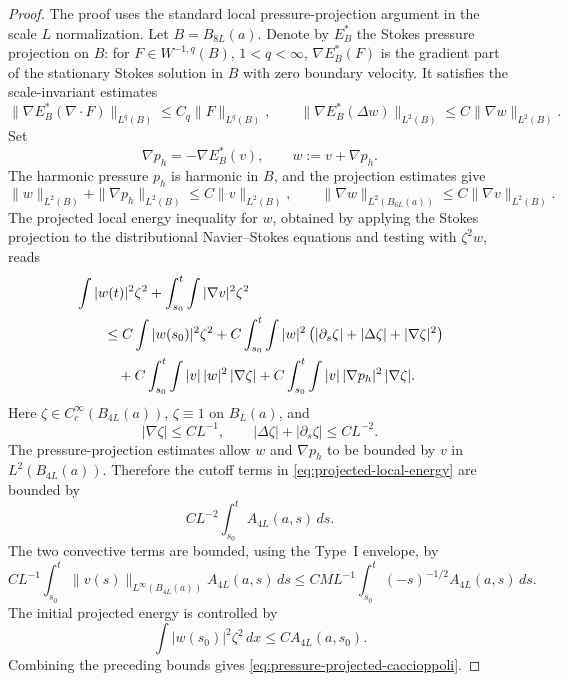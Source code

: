 \documentclass[11pt]{amsart}
\numberwithin{equation}{section}
\theoremstyle{plain}
\theoremstyle{definition}
\theoremstyle{remark}
\begin{document}
\begin{proof}
The proof uses the standard local pressure-projection argument in the scale \(L\)
normalization.  Let \(B=B_{8L}(a)\).  Denote by \(E_B^*\) the Stokes pressure
projection on \(B\): for \(F\in W^{-1,q}(B)\), \(1<q<\infty\),
\(\nabla E_B^*(F)\) is the gradient part of the stationary Stokes solution in
\(B\) with zero boundary velocity.  It satisfies the scale-invariant estimates
\[
   \|\nabla E_B^*(\nabla\cdot F)\|_{L^q(B)}
   \le C_q\|F\|_{L^q(B)},\qquad
   \|\nabla E_B^*(\Delta w)\|_{L^2(B)}
   \le C\|\nabla w\|_{L^2(B)}.
\]
Set
\[
   \nabla p_h=-\nabla E_B^*(v),\qquad
   w:=v+\nabla p_h .
\]
The harmonic pressure \(p_h\) is harmonic in \(B\), and the projection estimates
give
\[
   \|w\|_{L^2(B)}+\|\nabla p_h\|_{L^2(B)}
   \le C\|v\|_{L^2(B)},\qquad
   \|\nabla w\|_{L^2(B_{6L}(a))}
   \le C\|\nabla v\|_{L^2(B)} .
\]
The projected local energy inequality for \(w\), obtained by applying the
Stokes projection to the distributional Navier--Stokes equations and testing
with \(\zeta^2 w\), reads
\begin{align}
   &\int |w(t)|^2\zeta^2
      +\int_{s_0}^{t}\int |\nabla v|^2\zeta^2              \notag\\
   &\qquad\le
      C\int |w(s_0)|^2\zeta^2
      +C\int_{s_0}^{t}\int |w|^2
        \left(|\partial_s\zeta|+|\Delta\zeta|+|\nabla\zeta|^2\right)
                                                                  \notag\\
   &\qquad\quad
      +C\int_{s_0}^{t}\int |v|\,|w|^2\,|\nabla\zeta|
      +C\int_{s_0}^{t}\int |v|\,|\nabla p_h|^2\,|\nabla\zeta| .
\label{eq:projected-local-energy}
\end{align}
Here \(\zeta\in C_c^\infty(B_{4L}(a))\), \(\zeta\equiv1\) on \(B_L(a)\), and
\[
   |\nabla\zeta|\le CL^{-1},\qquad
   |\Delta\zeta|+|\partial_s\zeta|\le CL^{-2}.
\]
The pressure-projection estimates allow \(w\) and \(\nabla p_h\) to be bounded
by \(v\) in \(L^2(B_{4L}(a))\).  Therefore the cutoff terms in
\eqref{eq:projected-local-energy} are bounded by
\[
   C L^{-2}\int_{s_0}^{t}A_{4L}(a,s)\,ds .
\]
The two convective terms are bounded, using the Type~I envelope, by
\[
   C L^{-1}\int_{s_0}^{t}
      \|v(s)\|_{L^\infty(B_{4L}(a))}A_{4L}(a,s)\,ds
   \le
   CML^{-1}\int_{s_0}^{t}(-s)^{-1/2}A_{4L}(a,s)\,ds .
\]
The initial projected energy is controlled by
\[
   \int |w(s_0)|^2\zeta^2\,dx
   \le C A_{4L}(a,s_0).
\]
Combining the preceding bounds gives
\eqref{eq:pressure-projected-caccioppoli}.
\end{proof}
\end{document}
